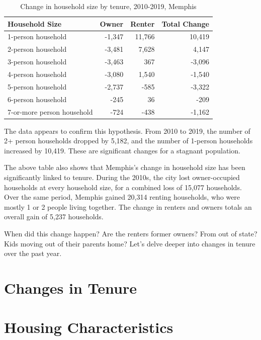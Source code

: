 \documentclass[
  openany]{book}
\begin{document}
\begin{table}

\caption{\label{tab:tenhhsizetbl}Change in household size by tenure, 2010-2019, Memphis}
\centering
\begin{tabular}[t]{l|r|r|r}
\hline
Household Size & Owner & Renter & Total Change\\
\hline
1-person household & -1,347 & 11,766 & 10,419\\
\hline
2-person household & -3,481 & 7,628 & 4,147\\
\hline
3-person household & -3,463 & 367 & -3,096\\
\hline
4-person household & -3,080 & 1,540 & -1,540\\
\hline
5-person household & -2,737 & -585 & -3,322\\
\hline
6-person household & -245 & 36 & -209\\
\hline
7-or-more person household & -724 & -438 & -1,162\\
\hline
\end{tabular}
\end{table}

The data appears to confirm this hypothesis. From 2010 to 2019, the number of 2+ person households dropped by 5,182, and the number of 1-person households increased by 10,419. These are significant changes for a stagnant population.

The above table also shows that Memphis's change in household size has been significantly linked to tenure. During the 2010s, the city lost owner-occupied households at every household size, for a combined loss of 15,077 households. Over the same period, Memphis gained 20,314 renting households, who were mostly 1 or 2 people living together. The change in renters and owners totals an overall gain of 5,237 households.

When did this change happen? Are the renters former owners? From out of state? Kids moving out of their parents home? Let's delve deeper into changes in tenure over the past year.

\hypertarget{changes-in-tenure}{%
\section{Changes in Tenure}\label{changes-in-tenure}}

\hypertarget{housing-characteristics}{%
\section{Housing Characteristics}\label{housing-characteristics}}
\end{document}
